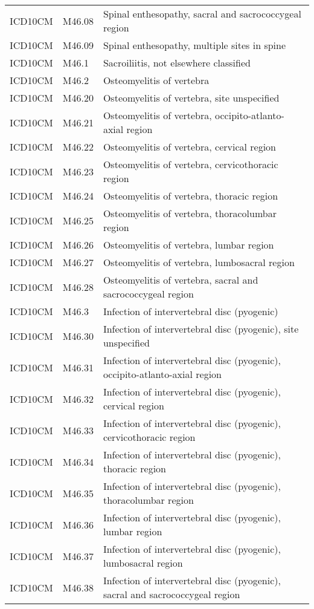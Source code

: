 \begin{longtable}{p{}p{}p{}}
  ICD10CM & M46.08 & Spinal enthesopathy, sacral and sacrococcygeal region \\ 
  ICD10CM & M46.09 & Spinal enthesopathy, multiple sites in spine \\ 
  ICD10CM & M46.1 & Sacroiliitis, not elsewhere classified \\ 
  ICD10CM & M46.2 & Osteomyelitis of vertebra \\ 
  ICD10CM & M46.20 & Osteomyelitis of vertebra, site unspecified \\ 
  ICD10CM & M46.21 & Osteomyelitis of vertebra, occipito-atlanto-axial region \\ 
  ICD10CM & M46.22 & Osteomyelitis of vertebra, cervical region \\ 
  ICD10CM & M46.23 & Osteomyelitis of vertebra, cervicothoracic region \\ 
  ICD10CM & M46.24 & Osteomyelitis of vertebra, thoracic region \\ 
  ICD10CM & M46.25 & Osteomyelitis of vertebra, thoracolumbar region \\ 
  ICD10CM & M46.26 & Osteomyelitis of vertebra, lumbar region \\ 
  ICD10CM & M46.27 & Osteomyelitis of vertebra, lumbosacral region \\ 
  ICD10CM & M46.28 & Osteomyelitis of vertebra, sacral and sacrococcygeal region \\ 
  ICD10CM & M46.3 & Infection of intervertebral disc (pyogenic) \\ 
  ICD10CM & M46.30 & Infection of intervertebral disc (pyogenic), site unspecified \\ 
  ICD10CM & M46.31 & Infection of intervertebral disc (pyogenic), occipito-atlanto-axial region \\ 
  ICD10CM & M46.32 & Infection of intervertebral disc (pyogenic), cervical region \\ 
  ICD10CM & M46.33 & Infection of intervertebral disc (pyogenic), cervicothoracic region \\ 
  ICD10CM & M46.34 & Infection of intervertebral disc (pyogenic), thoracic region \\ 
  ICD10CM & M46.35 & Infection of intervertebral disc (pyogenic), thoracolumbar region \\ 
  ICD10CM & M46.36 & Infection of intervertebral disc (pyogenic), lumbar region \\ 
  ICD10CM & M46.37 & Infection of intervertebral disc (pyogenic), lumbosacral region \\ 
  ICD10CM & M46.38 & Infection of intervertebral disc (pyogenic), sacral and sacrococcygeal region \\ 

\end{longtable}
